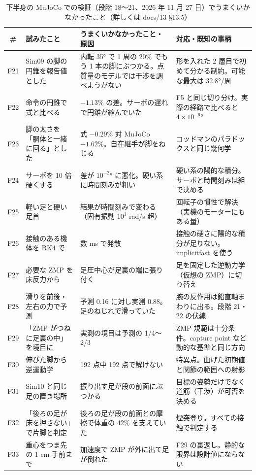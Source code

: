 \documentclass[paper=a4paper,fontsize=10pt,twocolumn,column_gap=2zw,line_length=24zw,number_of_lines=46,head_space=20mm]{jlreq}
\begin{document}
\begin{table}[t]\centering\footnotesize
\caption{下半身の MuJoCo での検証（段階 18〜21、2026 年 11 月 27 日）でうまくいかなかったこと（詳しくは docs/13 §13.5）}\label{tab:fail3}
\setlength{\tabcolsep}{3pt}
\begin{tabular}{cp{}p{}p{}}\toprule
\# & 試みたこと & うまくいかなかったこと・原因 & 対応・既知の事柄 \\\midrule
F21 & Sim09 の脚の円錐を報告値とした & 内転 35° で 1 周の 20\% でもう 1 本の脚にぶつかる。点質量のモデルでは干渉を調べようがない & 形を入れた 2 層目で初めて分かる制約。可能な最大は 32.8°/周 \\
F22 & 命令の円錐で式と比べる & $-1.13\%$ の差。サーボの遅れで円錐が縮んでいた & F5 と同じ切り分け。実際の経路で比べると $4\times10^{-6}$° \\
F23 & 脚の太さを「胴体と一緒に回る」とした & 式 $-0.29\%$ 対 MuJoCo $-1.62\%$。自在継手が脚をねじる & コッドマンのパラドックスと同じ幾何学 \\
F24 & サーボを 10 倍硬くする & 差が $10^{-2}$° に悪化。硬い系に時間刻みが粗い & 硬い系の陽的な積分。サーボと時間刻みは組で決める \\
F25 & 軽い足と硬い足首 & 結果が時間刻みで変わる（固有振動 $10^3$ rad/s 超） & 回転子の慣性で解決（実機のモーターにもある量） \\
F26 & 接触のある機体を RK4 で & 数 ms で発散 & 接触の硬さに陽的な積分が足りない。implicitfast を使う \\
F27 & 必要な ZMP を床反力から & 足圧中心が足裏の端に張り付く & 足を固定した逆動力学（仮想の ZMP）に切り替え \\
F28 & 滑りを前後・左右の力で予測 & 予測 0.16 に対し実測 0.88。足のねじれで滑っていた & 腕の反作用は鉛直軸まわりに出る。段階 21・22 の伏線 \\
F29 & 「ZMP がつねに足裏の中」を境目に & 実測の境目は予測の 1/4〜2/3 & ZMP 規範は十分条件。capture point など動的な基準と同じ方向 \\
F30 & 伸びた脚から逆運動学 & 192 点中 192 点で解けない & 特異点。曲げた初期値と関節の範囲への射影 \\
F31 & Sim10 と同じ足の置き場所 & 振り出す足が段の前面にぶつかる & 目標の姿勢だけでなく道筋（干渉）が可否を決める \\
F32 & 「後ろの足が床を押さない」で片脚と判定 & 後ろの足が段の前面との摩擦で体重の 42\% を支えていた & 煙突登り。すべての接触で判定する \\
F33 & 重心をつま先の 1 cm 手前まで & 加速度で ZMP が外に出て足が倒れた & F29 の裏返し。静的な限界は設計値にならない \\

\end{tabular}
\end{table}
\end{document}
